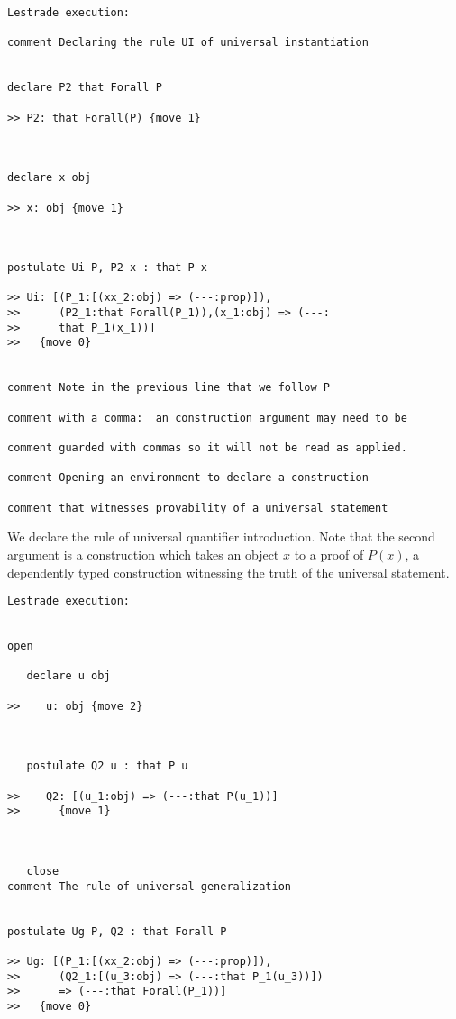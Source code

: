\documentclass[12pt]{article}
\begin{document}
\begin{verbatim}Lestrade execution:

comment Declaring the rule UI of universal instantiation


declare P2 that Forall P

>> P2: that Forall(P) {move 1}



declare x obj

>> x: obj {move 1}



postulate Ui P, P2 x : that P x

>> Ui: [(P_1:[(xx_2:obj) => (---:prop)]),
>>      (P2_1:that Forall(P_1)),(x_1:obj) => (---:
>>      that P_1(x_1))]
>>   {move 0}


comment Note in the previous line that we follow P 

comment with a comma:  an construction argument may need to be 

comment guarded with commas so it will not be read as applied.

comment Opening an environment to declare a construction 

comment that witnesses provability of a universal statement

\end{verbatim}

We declare the rule of universal quantifier introduction.  Note that the second argument is a construction which takes an object $x$ to a proof of $P(x)$, a dependently typed construction witnessing the truth of the universal statement.

\begin{verbatim}Lestrade execution:


open

   declare u obj

>>    u: obj {move 2}



   postulate Q2 u : that P u

>>    Q2: [(u_1:obj) => (---:that P(u_1))]
>>      {move 1}



   close
comment The rule of universal generalization


postulate Ug P, Q2 : that Forall P

>> Ug: [(P_1:[(xx_2:obj) => (---:prop)]),
>>      (Q2_1:[(u_3:obj) => (---:that P_1(u_3))])
>>      => (---:that Forall(P_1))]
>>   {move 0}


\end{verbatim}
\end{document}

